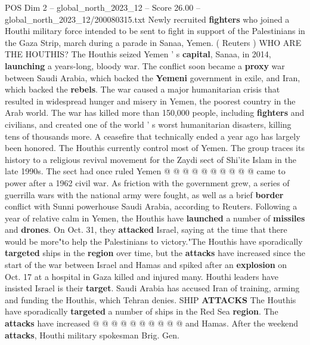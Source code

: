\begin{textsample}{POS Dim 2 – global\_north\_2023\_12 – Score 26.00 – global\_north\_2023\_12/200080315.txt}  \label{ex:f2_pos_233}
Newly recruited \textbf{fighters} who joined a Houthi military force intended to be sent to fight in support of the Palestinians in the Gaza Strip, march during a parade in Sanaa, Yemen. ( Reuters ) WHO ARE THE HOUTHIS?
The Houthis seized Yemen ' s \textbf{capital}, Sanaa, in 2014, \textbf{launching} a years-long, bloody war.
The conflict soon became a \textbf{proxy} war between Saudi Arabia, which backed the \textbf{Yemeni} government in exile, and Iran, which backed the \textbf{rebels}.
The war caused a major humanitarian crisis that resulted in widespread hunger and misery in Yemen, the poorest country in the Arab world.
The war has killed more than 150,000 people, including \textbf{fighters} and civilians, and created one of the world ' s worst humanitarian disasters, killing tens of thousands more.
A ceasefire that technically ended a year ago has largely been honored.
The Houthis currently control most of Yemen.
The group traces its history to a religious revival movement for the Zaydi sect of Shi'ite Islam in the late 1990s.
The sect had once ruled Yemen @ @ @ @ @ @ @ @ @ @ came to power after a 1962 civil war.
As friction with the government grew, a series of guerrilla wars with the national army were fought, as well as a brief \textbf{border} conflict with Sunni powerhouse Saudi Arabia, according to Reuters.
Following a year of relative calm in Yemen, the Houthis have \textbf{launched} a number of \textbf{missiles} and \textbf{drones}.
On Oct. 31, they \textbf{attacked} Israel, saying at the time that there would be more"to help the Palestinians to victory."The Houthis have sporadically \textbf{targeted} ships in the \textbf{region} over time, but the \textbf{attacks} have increased since the start of the war between Israel and Hamas and spiked after an \textbf{explosion} on Oct. 17 at a hospital in Gaza killed and injured many.
Houthi leaders have insisted Israel is their \textbf{target}.
Saudi Arabia has accused Iran of training, arming and funding the Houthis, which Tehran denies.
SHIP \textbf{ATTACKS} The Houthis have sporadically \textbf{targeted} a number of ships in the Red Sea \textbf{region}.
The \textbf{attacks} have increased @ @ @ @ @ @ @ @ @ @ and Hamas.
After the weekend \textbf{attacks}, Houthi military spokesman Brig.
Gen.

\end{textsample}
